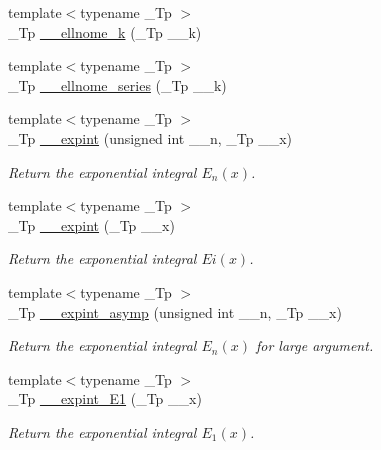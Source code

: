 \begin{DoxyCompactItemize}
\item 
{\footnotesize template$<$typename \+\_\+\+Tp $>$ }\\\+\_\+\+Tp \hyperlink{namespacestd_1_1____detail_a7631f367a1be34f98cec2021d588457b}{\+\_\+\+\_\+ellnome\+\_\+k} (\+\_\+\+Tp \+\_\+\+\_\+k)
\item 
{\footnotesize template$<$typename \+\_\+\+Tp $>$ }\\\+\_\+\+Tp \hyperlink{namespacestd_1_1____detail_aec07b9131f90495831d349d22768425f}{\+\_\+\+\_\+ellnome\+\_\+series} (\+\_\+\+Tp \+\_\+\+\_\+k)
\item 
{\footnotesize template$<$typename \+\_\+\+Tp $>$ }\\\+\_\+\+Tp \hyperlink{namespacestd_1_1____detail_a0282700710ec07b8ca095fe2ec140d6e}{\+\_\+\+\_\+expint} (unsigned int \+\_\+\+\_\+n, \+\_\+\+Tp \+\_\+\+\_\+x)
\begin{DoxyCompactList}\small\item\em Return the exponential integral $ E_n(x) $. \end{DoxyCompactList}\item 
{\footnotesize template$<$typename \+\_\+\+Tp $>$ }\\\+\_\+\+Tp \hyperlink{namespacestd_1_1____detail_abefd4102ce8a673604204e360074ceaa}{\+\_\+\+\_\+expint} (\+\_\+\+Tp \+\_\+\+\_\+x)
\begin{DoxyCompactList}\small\item\em Return the exponential integral $ Ei(x) $. \end{DoxyCompactList}\item 
{\footnotesize template$<$typename \+\_\+\+Tp $>$ }\\\+\_\+\+Tp \hyperlink{namespacestd_1_1____detail_a40a59e40ddbb049a8fd84959afd9ec7e}{\+\_\+\+\_\+expint\+\_\+asymp} (unsigned int \+\_\+\+\_\+n, \+\_\+\+Tp \+\_\+\+\_\+x)
\begin{DoxyCompactList}\small\item\em Return the exponential integral $ E_n(x) $ for large argument. \end{DoxyCompactList}\item 
{\footnotesize template$<$typename \+\_\+\+Tp $>$ }\\\+\_\+\+Tp \hyperlink{namespacestd_1_1____detail_a665eb0c524b929c035d88bbb17815917}{\+\_\+\+\_\+expint\+\_\+\+E1} (\+\_\+\+Tp \+\_\+\+\_\+x)
\begin{DoxyCompactList}\small\item\em Return the exponential integral $ E_1(x) $. \end{DoxyCompactList}\item 

\end{DoxyCompactItemize}

